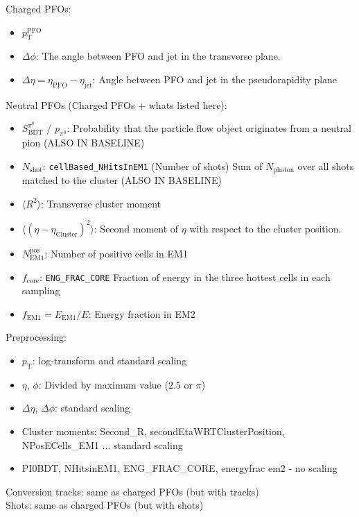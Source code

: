 Charged PFOs:
\begin{itemize}
\item $p_\text{T}^\text{PFO}$
\item $\Delta \phi$: The angle between PFO and jet in the transverse plane.
\item $\Delta \eta = \eta_\text{PFO} - \eta_\text{jet}$: Angle between PFO and
  jet in the pseudorapidity plane
\end{itemize}

Neutral PFOs (Charged PFOs + whats listed here):
\begin{itemize}
\item $S_\text{BDT}^{\pi^0}$ / $p_{\pi^0}$: Probability that the particle flow
  object originates from a neutral pion (ALSO IN BASELINE)
\item $N_\text{shot}$: \texttt{cellBased\_NHitsInEM1} (Number of shots) Sum of
  $N_\text{photon}$ over all shots matched to the cluster (ALSO IN BASELINE)
\item $\langle R^2 \rangle$: Transverse cluster moment
\item $\langle (\eta - \eta_\text{Cluster})^2 \rangle$: Second moment of $\eta$
  with respect to the cluster position.
\item $N_\text{EM1}^\text{pos}$: Number of positive cells in EM1
\item $f_\text{core}$: \texttt{ENG\_FRAC\_CORE} Fraction of energy in the three
  hottest cells in each sampling 
\item $f_\text{EM1} = E_\text{EM1} / E$: Energy fraction in EM2
\end{itemize}

Preprocessing:
\begin{itemize}
\item $p_\text{T}$: log-transform and standard scaling
\item $\eta$, $\phi$: Divided by maximum value ($2.5$ or $\pi$)
\item $\Delta \eta$, $\Delta \phi$: standard scaling
\item Cluster moments: Second\_R, secondEtaWRTClusterPosition, NPosECells\_EM1
  ... standard scaling
\item PI0BDT, NHitsinEM1, ENG\_FRAC\_CORE, energyfrac em2 - no scaling
\end{itemize}

Conversion tracks: same as charged PFOs (but with tracks) \\
Shots: same as charged PFOs (but with shots) \\



